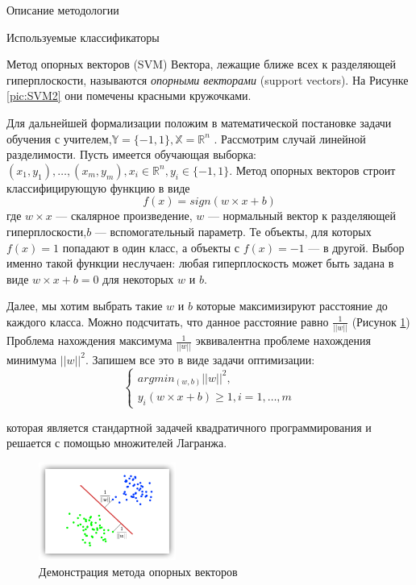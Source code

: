 \begin{section}{Описание методологии}
\begin{subsection}{Используемые классификаторы}
\begin{subsubsection}{Метод опорных векторов (SVM)}
Вектора, лежащие ближе всех к разделяющей гиперплоскости, называются \textit{опорными векторами} (support vectors). На Рисунке \ref{pic:SVM2} они помечены красными кружочками.

Для дальнейшей формализации положим в математической постановке задачи обучения с учителем,$\mathbb{Y} = \{-1,1\}, \mathbb{X} = \mathbb{R}^n$ .
Рассмотрим случай линейной разделимости. Пусть имеется обучающая выборка: $(x_1,y_1 ),…,(x_m,y_m ),x_i \in \mathbb{R}^n,y_i \in \{-1,1\}$.
Метод опорных векторов строит классифицирующую функцию  в виде
\begin{equation}
  f(x)=sign (w \times x + b)
\end{equation}
где $w \times x$ — скалярное произведение, $w$  — нормальный вектор к разделяющей гиперплоскости,$b$  — вспомогательный параметр. Те объекты, для которых $f(x) = 1$ попадают в один класс, а объекты с $f(x) = -1$ — в другой. Выбор именно такой функции неслучаен: любая гиперплоскость может быть задана в виде $w \times x + b = 0$ для некоторых $w$ и $b$.

Далее, мы хотим выбрать такие $w$ и $b$ которые максимизируют расстояние до каждого класса. Можно подсчитать, что данное расстояние равно $\frac{1}{||w||}$ (Рисунок \ref{pic:SVM3}) Проблема нахождения максимума $\frac{1}{||w||}$ эквивалентна проблеме нахождения минимума $||w||^2$. Запишем все это в виде задачи оптимизации:
\begin{equation}
  \begin{cases} arg⁡min_{(w,b)⁡} ||w||^2 , \\ y_i (w \times x+b) \geq 1, i=1,…,m \end{cases}
\end{equation}


которая является стандартной задачей квадратичного программирования и решается с помощью множителей Лагранжа.

\begin{figure}[ht!]
\centering
\includegraphics[width=0.4\textwidth]{pics/SVM3}
\caption{Демонстрация метода опорных векторов}
\label{pic:SVM3}
\end{figure}


\end{subsubsection}
\end{subsection}
\end{section}
